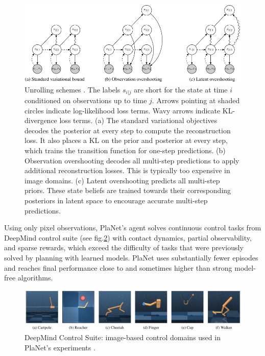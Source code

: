 \begin{figure}[H]
\includegraphics[width=1.0\textwidth,keepaspectratio]{figures/PlaNet/overshooting.png}
\caption[PlaNet latent dynamics model unrolling schemes]{Unrolling schemes \protect\cite{Algo.PlaNet}. The labels $s_{i|j}$ are short for the state at time $i$ conditioned on observations up to time $j$. Arrows pointing at shaded circles indicate log-likelihood loss terms. Wavy arrows indicate KL-divergence loss terms. (a) The standard variational objectives decodes the posterior at every step to compute the reconstruction loss. It also places a KL on the prior and posterior at every step, which trains the transition function for one-step predictions. (b) Observation overshooting decodes all multi-step predictions to apply additional reconstruction losses. This is typically too expensive in image domains. (c) Latent overshooting predicts all multi-step priors. These state beliefs are trained towards their corresponding posteriors in latent space to encourage accurate multi-step predictions.}
\label{Fig.PlaNetModelUnrolling}
\end{figure}

 Using only pixel observations, PlaNet's agent solves continuous control tasks from DeepMind control suite (see fig.\ref{Fig.DeepMindControlSuite}) with contact dynamics, partial observability, and sparse rewards, which exceed the difficulty of tasks that were previously solved by planning with learned models. PlaNet uses substantially fewer episodes and reaches final performance close to and sometimes higher than strong model-free algorithms.

\begin{figure}[H]
\includegraphics[width=1.0\textwidth,keepaspectratio]{figures/PlaNet/benchmarks.png}
\caption[DeepMind Control Suite]{DeepMind Control Suite: image-based control domains used in PlaNet's experiments \protect\cite{Algo.PlaNet}.}
\label{Fig.DeepMindControlSuite}
\end{figure}


